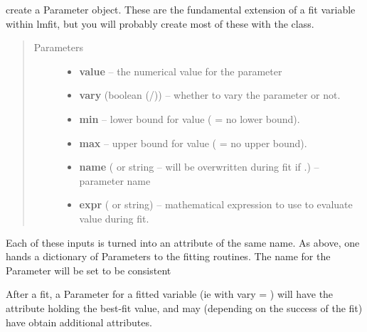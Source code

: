 \documentclass[letterpaper,10pt,english]{sphinxmanual}
\begin{document}
\begin{fulllineitems}
\label{parameters:Parameter}
create a Parameter object.  These are the fundamental extension of a fit
variable within lmfit, but you will probably create most of these with
the {\hyperref[parameters:Parameters]{}} class.
\begin{quote}\begin{description}
\item[{Parameters}] \leavevmode\begin{itemize}
\item {} 
\textbf{value} -- the numerical value for the parameter

\item {} 
\textbf{vary} (boolean (/)) -- whether to vary the parameter or not.

\item {} 
\textbf{min} -- lower bound for value ( = no lower bound).

\item {} 
\textbf{max} -- upper bound for value ( = no upper bound).

\item {} 
\textbf{name} ( or string -- will be overwritten during fit if .) -- parameter name

\item {} 
\textbf{expr} ( or string) -- mathematical expression to use to evaluate value during fit.

\end{itemize}

\end{description}\end{quote}

\end{fulllineitems}


Each of these inputs is turned into an attribute of the same name.   As
above, one hands a dictionary of Parameters to the fitting routines.   The
name for the Parameter will be set to be consistent

After a fit, a Parameter for a fitted variable (ie with vary = )
will have the  attribute holding the best-fit value, and may
(depending on the success of the fit) have obtain additional attributes.
\end{document}
